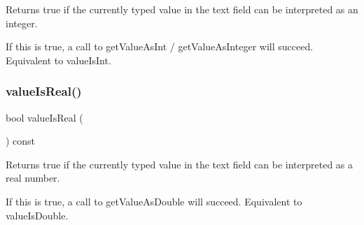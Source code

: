Returns true if the currently typed value in the text field can be interpreted as an integer. 

If this is true, a call to get\+Value\+As\+Int / get\+Value\+As\+Integer will succeed. Equivalent to value\+Is\+Int. \mbox{\label{classsgl_1_1GTextField_a29a5f540431d7993ff00eee5d2584a36}} 
\subsubsection{\texorpdfstring{value\+Is\+Real()}{valueIsReal()}}
{\footnotesize\ttfamily bool value\+Is\+Real (\begin{DoxyParamCaption}{ }\end{DoxyParamCaption}) const\hspace{0.3cm}{\ttfamily [virtual]}}



Returns true if the currently typed value in the text field can be interpreted as a real number. 

If this is true, a call to get\+Value\+As\+Double will succeed. Equivalent to value\+Is\+Double. 